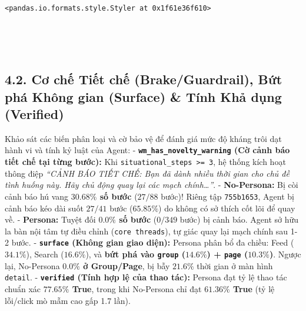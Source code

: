 \documentclass[11pt]{article}
\begin{document}
    
    \begin{Verbatim}[commandchars=\\\{\}]
<pandas.io.formats.style.Styler at 0x1f61e36f610>
    \end{Verbatim}

    
    \begin{center}
    \end{center}
    { \hspace*{\fill} \\}
    
    \begin{center}
    \end{center}
    { \hspace*{\fill} \\}
    
    \subsection{4.2. Cơ chế Tiết chế (Brake/Guardrail), Bứt phá Không gian
(Surface) \& Tính Khả dụng
(Verified)}\label{cux1a1-chux1ebf-tiux1ebft-chux1ebf-brakeguardrail-bux1ee9t-phuxe1-khuxf4ng-gian-surface-tuxednh-khux1ea3-dux1ee5ng-verified}

Khảo sát các biến phân loại và cờ bảo vệ để đánh giá mức độ kháng trôi
dạt hành vi và tính kỷ luật của Agent: -
\textbf{\texttt{wm\_has\_novelty\_warning} (Cờ cảnh báo tiết chế tại
từng bước):} Khi \texttt{situational\_steps\ \textgreater{}=\ 3}, hệ
thống kích hoạt thông điệp \emph{``CẢNH BÁO TIẾT CHẾ: Bạn đã dành nhiều
thời gian cho chủ đề tình huống này. Hãy chủ động quay lại các mạch
chính\ldots{}''}. - \textbf{No-Persona:} Bị còi cảnh báo hú vang
\textbf{\(30.68\%\) số bước} (\(27/88\) bước)! Riêng tập
\texttt{755b1653}, Agent bị cảnh báo kéo dài suốt \(27/41\) bước
(\(65.85\%\)) do không có sở thích cốt lõi để quay về. -
\textbf{Persona:} Tuyệt đối \textbf{\(0.0\%\) số bước} (\(0/349\) bước)
bị cảnh báo. Agent sở hữu la bàn nội tâm tự điều chỉnh
(\texttt{core\ threads}), tự giác quay lại mạch chính sau 1-2 bước. -
\textbf{\texttt{surface} (Không gian giao diện):} Persona phân bổ đa
chiều: Feed (\(34.1\%\)), Search (\(16.6\%\)), và \textbf{bứt phá vào
\texttt{group} (\(14.6\%\)) + \texttt{page} (\(10.3\%\))}. Ngược lại,
No-Persona \textbf{\(0.0\%\) ở Group/Page}, bị bẫy \(21.6\%\) thời gian
ở màn hình \texttt{detail}. - \textbf{\texttt{verified} (Tính hợp lệ của
thao tác):} Persona đạt tỷ lệ thao tác chuẩn xác \textbf{\(77.65\%\)
True}, trong khi No-Persona chỉ đạt \textbf{\(61.36\%\) True} (tỷ lệ
lỗi/click mò mẫm cao gấp 1.7 lần).
\end{document}
